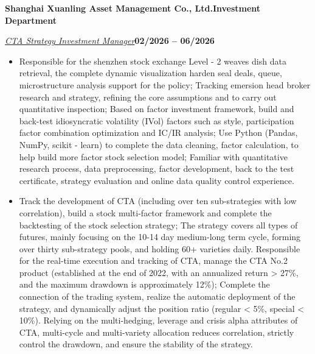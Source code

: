 \documentclass[10pt,a4paper]{article}
\newcommand{\entrycompany}[2]{%
  \par\vspace{0.80bp}\noindent\textbf{#1}\hfill\textbf{#2}\par\vspace{0.50bp}%
}
\let\jobcompany\entrycompany
\newcommand{\metaline}[2]{%
  \par\noindent\uline{\textit{#1}}\hfill\textbf{#2}\par\vspace{0.50bp}%
}
\let\roleline\metaline
\newenvironment{cvitems}{%
  \begin{itemize}[leftmargin=14.20bp,labelwidth=4.20bp,labelsep=10.00bp,align=left,
    topsep=0bp,itemsep=0bp,parsep=0bp,partopsep=0bp,label={\textbullet}]
}{\end{itemize}}
\begin{document}
\jobcompany{Shanghai Xuanling Asset Management Co., Ltd.}{Investment Department}
\roleline{CTA Strategy Investment Manager}{02/2026 -- 06/2026}
\begin{cvitems}
\item Responsible for the shenzhen stock exchange Level - 2 weaves dish data retrieval, the complete dynamic visualization harden seal deals, queue, microstructure analysis support for the policy; Tracking emersion head broker research and strategy, refining the core assumptions and to carry out quantitative inspection; Based on factor investment framework, build and back-test idiosyncratic volatility (IVol) factors such as style, participation factor combination optimization and IC/IR analysis; Use Python (Pandas, NumPy, scikit - learn) to complete the data cleaning, factor calculation, to help build more factor stock selection model; Familiar with quantitative research process, data preprocessing, factor development, back to the test certificate, strategy evaluation and online data quality control experience.
\item Track the development of CTA (including over ten sub-strategies with low correlation), build a stock multi-factor framework and complete the backtesting of the stock selection strategy; The strategy covers all types of futures, mainly focusing on the 10-14 day medium-long term cycle, forming over thirty sub-strategy pools, and holding 60+ varieties daily. Responsible for the real-time execution and tracking of CTA, manage the CTA No.2 product (established at the end of 2022, with an annualized return \textgreater{} 27\%, and the maximum drawdown is approximately 12\%); Complete the connection of the trading system, realize the automatic deployment of the strategy, and dynamically adjust the position ratio (regular \textless{} 5\%, special \textless{} 10\%). Relying on the multi-hedging, leverage and crisis alpha attributes of CTA, multi-cycle and multi-variety allocation reduces correlation, strictly control the drawdown, and ensure the stability of the strategy.
\end{cvitems}
\end{document}
